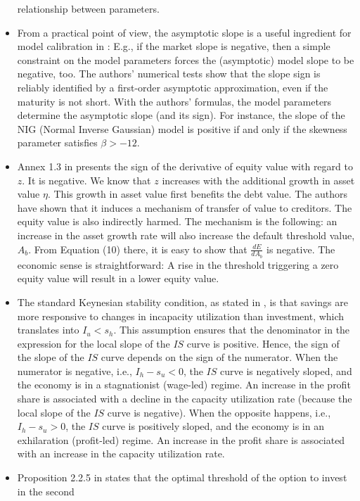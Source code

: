 \documentclass[11pt]{book}
\begin{document}
\begin{itemize}
relationship between parameters.
\item From a practical point of view, the asymptotic slope is a useful ingredient
for model calibration in \cite{pinter2017small}:
E.g., if the market slope is negative, then a simple constraint on
the model parameters forces the (asymptotic) model slope to be negative,
too. The authors' numerical tests show that the slope sign is reliably
identified by a first-order asymptotic approximation, even if the
maturity is not short. With the authors' formulas, the model parameters
determine the asymptotic slope (and its sign). For instance, the slope
of the NIG (Normal Inverse Gaussian) model is positive if and only
if the skewness parameter satisfies $\beta>-12$.
\item Annex 1.3 in \cite{de2017debt}
presents the sign of the derivative of equity value with regard to
$z$. It is negative. We know that $z$ increases with the additional
growth in asset value $\eta$. This growth in asset value first benefits
the debt value. The authors have shown that it induces a mechanism
of transfer of value to creditors. The equity value is also indirectly
harmed. The mechanism is the following: an increase in the asset growth
rate will also increase the default threshold value, $A_{b}$. From
Equation (10) there, it is easy to show that $\frac{dE}{dA_{b}}$
is negative. The economic sense is straightforward: A rise in the
threshold triggering a zero equity value will result in a lower equity
value.
\item The standard Keynesian stability condition, as stated in \cite{basu2018does},
is that savings are more responsive to changes in incapacity utilization
than investment, which translates into $I_{u}<s_{h}$. This assumption
ensures that the denominator in the expression for the local slope
of the $IS$ curve is positive. Hence, the sign of the slope of the
$IS$ curve depends on the sign of the numerator. When the numerator
is negative, i.e., $I_{h}-s_{u}<0$, the $IS$ curve is negatively
sloped, and the economy is in a stagnationist (wage-led) regime. An
increase in the profit share is associated with a decline in the capacity
utilization rate (because the local slope of the $IS$ curve is negative).
When the opposite happens, i.e., $I_{h}-s_{u}>0$, the $IS$ curve
is positively sloped, and the economy is in an exhilaration (profit-led)
regime. An increase in the profit share is associated with an increase
in the capacity utilization rate.
\item Proposition 2.2.5 in \cite{olsen2018optimal}
states that the optimal threshold of the option to invest in the second

\end{itemize}
\end{document}
